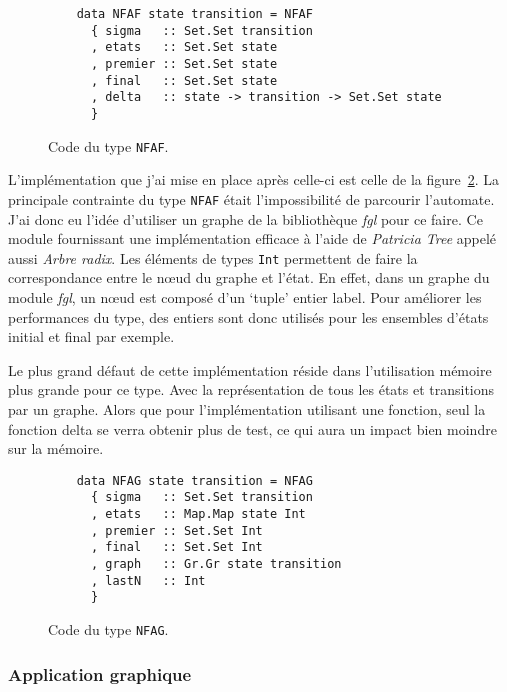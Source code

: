 \begin{figure}[H]
    \begin{verbatim}
    data NFAF state transition = NFAF
      { sigma   :: Set.Set transition
      , etats   :: Set.Set state
      , premier :: Set.Set state
      , final   :: Set.Set state
      , delta   :: state -> transition -> Set.Set state
      }
  \end{verbatim}
    \caption{Code du type \texttt{NFAF}.}\label{fig:codeNFAF}
\end{figure}

\vphantom{}

L'implémentation que j'ai mise en place après celle-ci est celle de la
figure~\ref{fig:codeNFAG}. La principale contrainte du type
\texttt{NFAF} était l'impossibilité de parcourir l'automate. J'ai
donc eu l'idée d'utiliser un graphe de la bibliothèque \textit{fgl} pour ce 
faire. Ce module fournissant une implémentation efficace à l'aide de 
\textit{Patricia Tree}
appelé aussi \textit{Arbre radix}\cite{arbreRadix}. Les éléments de types
\texttt{Int} permettent de faire la correspondance entre le n\oe ud
du graphe et l'état. En effet, dans un graphe du module \textit{fgl}, un n\oe ud
est composé d'un `tuple' entier label. Pour améliorer les performances du type,
des entiers sont donc utilisés pour les ensembles d'états initial et final par
exemple.

\vphantom{}

Le plus grand défaut de cette implémentation réside dans l'utilisation
mémoire plus grande pour ce type. Avec la représentation de tous les états et 
transitions par un graphe. Alors que pour l'implémentation utilisant
une fonction, seul la fonction delta se verra obtenir plus de test, ce qui aura 
un impact bien moindre sur la mémoire.

\begin{figure}[H]
    \begin{verbatim}
    data NFAG state transition = NFAG
      { sigma   :: Set.Set transition
      , etats   :: Map.Map state Int
      , premier :: Set.Set Int
      , final   :: Set.Set Int
      , graph   :: Gr.Gr state transition
      , lastN   :: Int
      }
  \end{verbatim}
    \caption{Code du type \texttt{NFAG}.}\label{fig:codeNFAG}
\end{figure}

\subsubsection{Application graphique}

